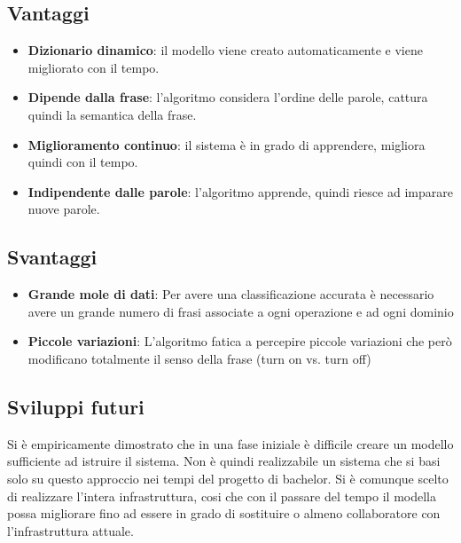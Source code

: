 \documentclass[twoside]{supsistudent}
\begin{document}
\subsection{Vantaggi}
\begin{itemize}
  \item \textbf{Dizionario dinamico}: il modello viene creato automaticamente e viene migliorato con il tempo.
  \item \textbf{Dipende dalla frase}: l'algoritmo considera l'ordine delle parole, cattura quindi la semantica della frase.
  \item \textbf{Miglioramento continuo}: il sistema è in grado di apprendere, migliora quindi con il tempo.
  \item \textbf{Indipendente dalle parole}: l'algoritmo apprende, quindi riesce ad imparare nuove parole.
\end{itemize}
\subsection{Svantaggi}
\begin{itemize}
  \item \textbf{Grande mole di dati}: Per avere una classificazione accurata è necessario avere un grande numero di frasi associate a ogni operazione e ad ogni dominio
  \item \textbf{Piccole variazioni}: L'algoritmo fatica a percepire piccole variazioni che però modificano totalmente il senso della frase (turn on vs. turn off)
\end{itemize}
\subsection{Sviluppi futuri}
Si è empiricamente dimostrato che in una fase iniziale è difficile creare un modello sufficiente ad istruire il sistema. Non è quindi realizzabile un sistema che si basi solo su questo approccio nei tempi del progetto di bachelor. Si è comunque scelto di realizzare l'intera infrastruttura, cosi che con il passare del tempo il modella possa migliorare fino ad essere in grado di sostituire o almeno collaboratore con l'infrastruttura attuale.
\newpage

\end{document}
